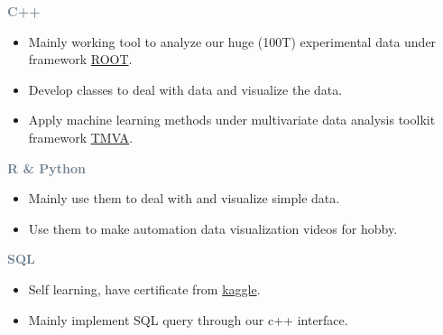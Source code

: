 

\divider




\textcolor{SlateGrey}{\textbf{C++}}
\newline

\begin{itemize}
    \item Mainly working tool to analyze our huge (100T) experimental data under framework \href{https://root.cern/}{ROOT}.
    \item Develop classes to deal with data and visualize the data.
    \item Apply machine learning methods under multivariate data analysis toolkit framework \href{https://root.cern/manual/tmva/}{TMVA}.
\end{itemize}

\textcolor{SlateGrey}{\textbf{R \& Python}}
\newline

\begin{itemize}
    \item Mainly use them to deal with and visualize simple data.
    \item Use them to make automation data visualization videos for hobby. 
\end{itemize}

\textcolor{SlateGrey}{\textbf{SQL}}
\newline

\begin{itemize}
    \item Self learning, have certificate from \href{https://www.kaggle.com/learn/overview}{kaggle}.
    \item Mainly implement SQL query through our c++ interface.
\end{itemize}

